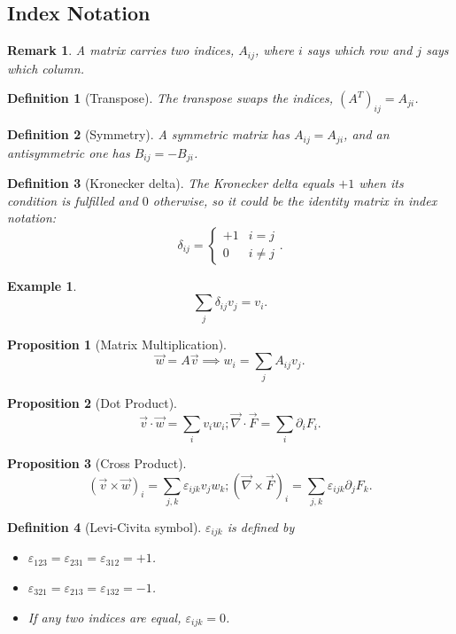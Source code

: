 \documentclass{article}
\newtheorem{definition}{Definition}
\newtheorem*{example}{Example}
\newtheorem{remark}{Remark}
\newtheorem{proposition}{Proposition}
\begin{document}
\subsection{Index Notation}
\begin{remark}
    A matrix carries two indices, $A_{ij}$, where $i$ says which row and $j$ says which column.
\end{remark}
\begin{definition}[Transpose]
    The transpose swaps the indices, $(A^T)_{ij} = A_{ji}$.
\end{definition}
\begin{definition}[Symmetry]
    A symmetric matrix has $A_{ij} = A_{ji}$, and an antisymmetric one has $B_{ij} = -B_{ji}$.
\end{definition}
\begin{definition}[Kronecker delta]
    The Kronecker delta equals $+1$ when its condition is fulfilled and $0$ otherwise, so it could be the identity matrix in index notation:
    \[\delta_{ij} = \begin{cases} +1 & i = j \\ 0 & i \neq j \end{cases}.\]
\end{definition}
\begin{example}
    \[\sum_j \delta_{ij}v_j = v_i.\]
\end{example}
\begin{proposition}[Matrix Multiplication]
    \[\vec{w} = A\vec{v} \implies w_i = \sum_j A_{ij}v_j.\]
\end{proposition}
\begin{proposition}[Dot Product]
    \[\vec{v}\cdot\vec{w} = \sum_i v_iw_i; \vec{\nabla}\cdot\vec{F} = \sum_i \partial_i F_i.\]
\end{proposition}
\begin{proposition}[Cross Product]
    \[(\vec{v}\times\vec{w})_i = \sum_{j,k}\varepsilon_{ijk}v_jw_k; (\vec{\nabla}\times\vec{F})_i = \sum_{j,k}\varepsilon_{ijk}\partial_j F_k.\]
\end{proposition}
\begin{definition}[Levi-Civita symbol]
    $\varepsilon_{ijk}$ is defined by
    \begin{itemize}
        \item $\varepsilon_{123} = \varepsilon_{231} = \varepsilon_{312} = +1$.
        \item $\varepsilon_{321} = \varepsilon_{213} = \varepsilon_{132} = -1$.
        \item If any two indices are equal, $\varepsilon_{ijk} = 0$.
    \end{itemize}
\end{definition}
\end{document}
